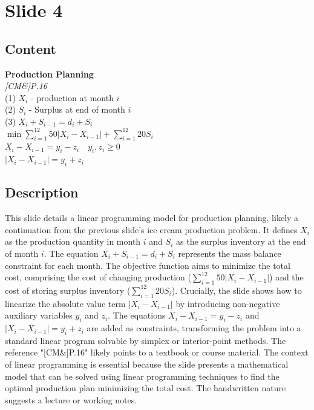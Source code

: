 \documentclass{article}%
\begin{document}
%
\newpage%
\section{Slide 4}%
\label{sec:Slide4}%
\subsection{Content}%

\textbf{Production Planning} \\
\textit{[CM\&]P.16} \\
(1) $X_i$ - production at month $i$ \\
(2) $S_i$ - Surplus at end of month $i$ \\
(3) $X_i + S_{i-1} = d_i + S_i$ \\
$\min \sum_{i=1}^{12} 50|X_i - X_{i-1}| + \sum_{i=1}^{12} 20 S_i$ \\
$X_i - X_{i-1} = y_i - z_i \quad y_i, z_i \ge 0$ \\
$|X_i - X_{i-1}| = y_i + z_i$
%
\subsection{Description}%
This slide details a linear programming model for production planning, likely a continuation from the previous slide's ice cream production problem.  It defines $X_i$ as the production quantity in month $i$ and $S_i$ as the surplus inventory at the end of month $i$. The equation $X_i + S_{i-1} = d_i + S_i$ represents the mass balance constraint for each month. The objective function aims to minimize the total cost, comprising the cost of changing production ($\sum_{i=1}^{12} 50|X_i - X_{i-1}|$) and the cost of storing surplus inventory ($\sum_{i=1}^{12} 20 S_i$).  Crucially, the slide shows how to linearize the absolute value term $|X_i - X_{i-1}|$ by introducing non-negative auxiliary variables $y_i$ and $z_i$. The equations $X_i - X_{i-1} = y_i - z_i$ and $|X_i - X_{i-1}| = y_i + z_i$ are added as constraints, transforming the problem into a standard linear program solvable by simplex or interior-point methods. The reference "[CM\&]P.16" likely points to a textbook or course material. The context of linear programming is essential because the slide presents a mathematical model that can be solved using linear programming techniques to find the optimal production plan minimizing the total cost. The handwritten nature suggests a lecture or working notes.%
\end{document}
